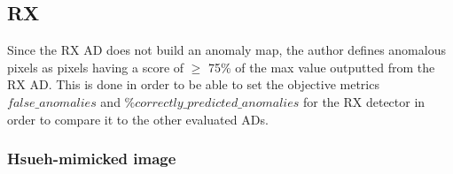 \subsection{RX}
Since the RX AD does not build an anomaly map, the author defines anomalous pixels as pixels having a score of $\geqslant$ 75\% of the max value outputted from the RX AD. This is done in order to be able to set the objective metrics $false\_anomalies$ and $\%correctly\_predicted\_anomalies$ for the RX detector in order to compare it to the other evaluated ADs. 

\subsubsection{Hsueh-mimicked image}

\begin{figure}[H]
\begin{minipage}[]{.5\linewidth}
\centering
{}
\end{minipage}%
\begin{minipage}[]{.5\linewidth}
\centering

\end{minipage}
\end{figure}
